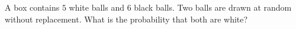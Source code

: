 A box contains $5$ white balls and $6$ black balls. Two balls are drawn at random without replacement. What is the probability that both are white?

